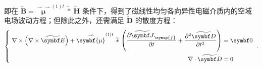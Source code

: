 即在 $\widetilde{\symbf B} = \overset{\rightharpoonup\!\!\!\! \rightharpoonup}{\symbf{\mu}}^{(1)t}\ \widetilde *\ \widetilde{\symbf H}$ 条件下，得到了磁线性均匀各向异性电磁介质内的空域电场波动方程；但除此之外，还需满足 $\widetilde{\symbf D}$ 的散度方程：
\begin{equation} \label{eq:2-6}
	\left\{\ \begin{aligned} \nabla \times \left( \nabla \times \widetilde{\symbf E} \right) + \overset{\rightharpoonup\!\!\!\! \rightharpoonup}{\symbf{\mu}}^{(1)t}\ \widetilde *\  \displaystyle{\left( \frac{\partial \widetilde{\symbf J}_{\symup{f}}}{\partial t } + \frac{\partial^2 \widetilde{\symbf D}}{\partial t^2} \right)} &= \symbf 0 \\ \nabla \cdot \widetilde{\symbf D} &= 0 \end{aligned}\right. ~.
\end{equation}

